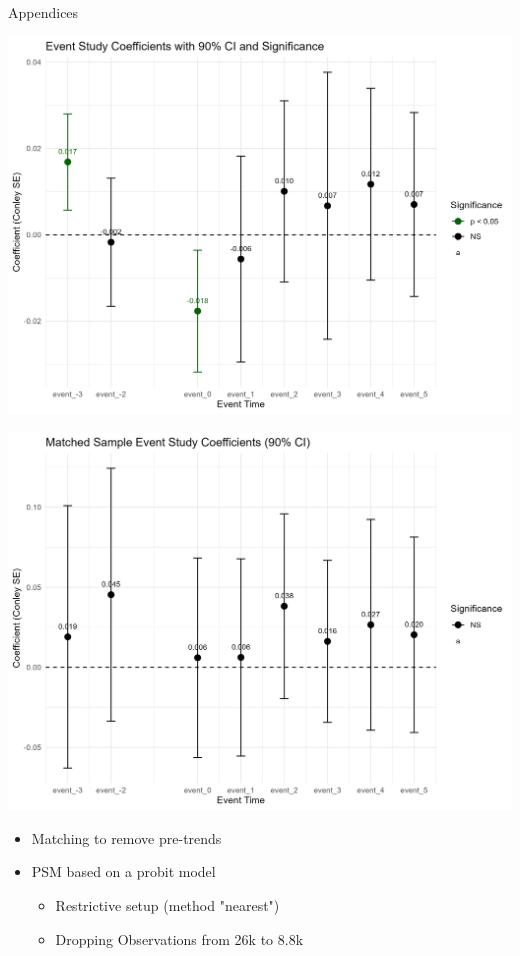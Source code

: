 \documentclass[
  xcolor=svgnames,
  bookmarks=true,
  bookmarksopen=true,
  pdfborder={0 0 0},
  pdfhighlight={/N},
  linkbordercolor={rgb}{0.5,0.5,0.5},
  implicit=false,
  colorlinks=true,
  allcolors=deepblue
]{beamer}
\begin{document}
\begin{frame}{Appendices}
\centering
\begin{minipage}{0.49\textwidth}
    \centering
    \includegraphics[width=\linewidth]{Results Pre Matching.png}
\end{minipage}
\hfill
\begin{minipage}{0.49\textwidth}
    \centering
    \includegraphics[width=\linewidth]{Results Post Matching.png}
\end{minipage}
\begin{itemize}
    \item Matching to remove pre-trends
    \item PSM based on a probit model
    \begin{itemize}
        \item Restrictive setup (method "nearest")
        \item Dropping Observations from 26k to 8.8k
    \end{itemize}
\end{itemize}
\end{frame}
\end{document}
